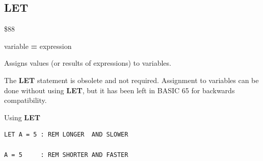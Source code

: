 
\newpage
\subsection{LET}
\begin{description}[leftmargin=2cm,style=nextline]
\item [Token:]    \$88

\item [Format:]   [{\bf LET}] variable {\bf=} expression

\item [Usage:]    Assigns values (or results of expressions) to variables.

\item [Remarks:]  The {\bf LET} statement is obsolete and not required. Assignment to variables can be done without using {\bf LET}, but it has been left in BASIC 65 for backwards compatibility.

\item [Examples:] Using {\bf LET}

\begin{tcolorbox}[colback=black,coltext=white]
\verbatimfont{\codefont}
\begin{verbatim}
LET A = 5 : REM LONGER  AND SLOWER

A = 5     : REM SHORTER AND FASTER
\end{verbatim}
\end{tcolorbox}
\end{description}


\newpage
